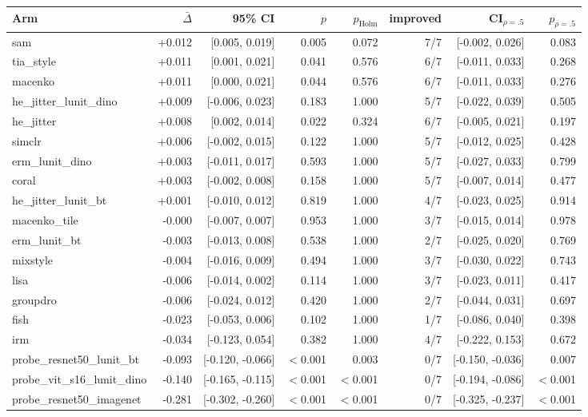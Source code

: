 \begin{tabular}{lrrrrrrr}
\toprule
Arm & $\bar\Delta$ & 95\% CI & $p$ & $p_\text{Holm}$ & improved & CI$_{\rho=.5}$ & $p_{\rho=.5}$ \\
\midrule
sam & +0.012 & [0.005, 0.019] & 0.005 & 0.072 & 7/7 & [-0.002, 0.026] & 0.083 \\
tia\_style & +0.011 & [0.001, 0.021] & 0.041 & 0.576 & 6/7 & [-0.011, 0.033] & 0.268 \\
macenko & +0.011 & [0.000, 0.021] & 0.044 & 0.576 & 6/7 & [-0.011, 0.033] & 0.276 \\
he\_jitter\_lunit\_dino & +0.009 & [-0.006, 0.023] & 0.183 & 1.000 & 5/7 & [-0.022, 0.039] & 0.505 \\
he\_jitter & +0.008 & [0.002, 0.014] & 0.022 & 0.324 & 6/7 & [-0.005, 0.021] & 0.197 \\
simclr & +0.006 & [-0.002, 0.015] & 0.122 & 1.000 & 5/7 & [-0.012, 0.025] & 0.428 \\
erm\_lunit\_dino & +0.003 & [-0.011, 0.017] & 0.593 & 1.000 & 5/7 & [-0.027, 0.033] & 0.799 \\
coral & +0.003 & [-0.002, 0.008] & 0.158 & 1.000 & 5/7 & [-0.007, 0.014] & 0.477 \\
he\_jitter\_lunit\_bt & +0.001 & [-0.010, 0.012] & 0.819 & 1.000 & 4/7 & [-0.023, 0.025] & 0.914 \\
macenko\_tile & -0.000 & [-0.007, 0.007] & 0.953 & 1.000 & 3/7 & [-0.015, 0.014] & 0.978 \\
erm\_lunit\_bt & -0.003 & [-0.013, 0.008] & 0.538 & 1.000 & 2/7 & [-0.025, 0.020] & 0.769 \\
mixstyle & -0.004 & [-0.016, 0.009] & 0.494 & 1.000 & 3/7 & [-0.030, 0.022] & 0.743 \\
lisa & -0.006 & [-0.014, 0.002] & 0.114 & 1.000 & 3/7 & [-0.023, 0.011] & 0.417 \\
groupdro & -0.006 & [-0.024, 0.012] & 0.420 & 1.000 & 2/7 & [-0.044, 0.031] & 0.697 \\
fish & -0.023 & [-0.053, 0.006] & 0.102 & 1.000 & 1/7 & [-0.086, 0.040] & 0.398 \\
irm & -0.034 & [-0.123, 0.054] & 0.382 & 1.000 & 4/7 & [-0.222, 0.153] & 0.672 \\
probe\_resnet50\_lunit\_bt & -0.093 & [-0.120, -0.066] & $<$0.001 & 0.003 & 0/7 & [-0.150, -0.036] & 0.007 \\
probe\_vit\_s16\_lunit\_dino & -0.140 & [-0.165, -0.115] & $<$0.001 & $<$0.001 & 0/7 & [-0.194, -0.086] & $<$0.001 \\
probe\_resnet50\_imagenet & -0.281 & [-0.302, -0.260] & $<$0.001 & $<$0.001 & 0/7 & [-0.325, -0.237] & $<$0.001 \\
\bottomrule
\end{tabular}

